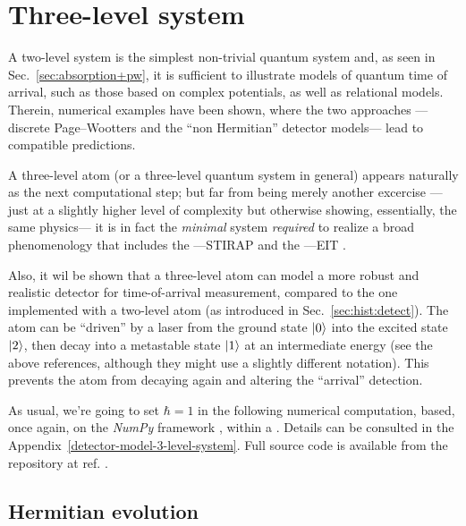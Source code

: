 \section{Three-level system}\label{sec:pw3l}

A two-level system is the simplest non-trivial quantum system and,
as seen in Sec.~\ref{sec:absorption+pw},
it is sufficient to illustrate
models of quantum time of arrival,
such as those based on complex potentials,
as well as relational models.
Therein, numerical examples have been shown, where the two approaches
---discrete Page--Wootters and the ``non Hermitian'' detector models---
lead to
compatible predictions.

A three-level atom (or a three-level quantum system in general) appears
naturally
as
the next computational step;
but far from being merely another excercise
---just at a slightly higher level of complexity
but otherwise showing, essentially, the same physics---
it is in fact the \emph{minimal} system \emph{required}
to realize a broad
phenomenology that includes the
---STIRAP \parencite{Ruschhaupt_AtomDiode, NonHermitianShortcutSTIRAP, OptimizedTransferSTIRAP, Ruschhaupt_STA23}
and the
---EIT \parencite{EIT_Review}.

Also, it wil be shown that a three-level atom can model
a more robust and realistic
detector for time-of-arrival measurement, compared to the one implemented
with a two-level atom (as introduced in Sec.~\ref{sec:hist:detect}).
The atom can be ``driven'' by a laser
from the ground state $\ket{0}$ into the excited state $\ket{2}$,
then decay into a metastable state $\ket{1}$ at an intermediate energy
(see the above references, although they might use a slightly different notation).
This prevents the atom from decaying again and altering the ``arrival'' detection.

As usual, we're going to set $\hbar = 1$ in the following numerical computation,
based, once again, on the
\emph{NumPy} framework \parencite{comp:numpy},
within a
 \parencite{comp:jupyter}.
Details can be consulted in the Appendix~\ref{detector-model-3-level-system}.
Full source code is available from the repository at ref. \cite{OwnJupyterRepo}.

\subsection{Hermitian evolution}

